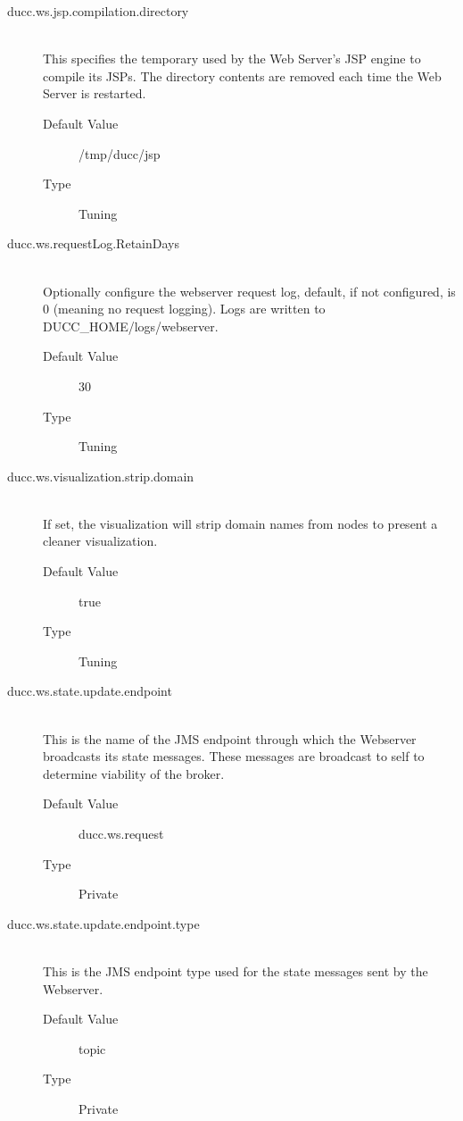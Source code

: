 \begin{description}
        \item[ducc.ws.jsp.compilation.directory] \hfill \\
          This specifies the temporary used by the Web Server's JSP engine to compile its JSPs.
          The directory contents are removed each time the Web Server is restarted.
          \begin{description}
            \item[Default Value] /tmp/ducc/jsp
            \item[Type] Tuning
          \end{description}

        \item[ducc.ws.requestLog.RetainDays] \hfill \\
          Optionally configure the webserver request log, default, if not configured, is 0 (meaning no request logging).
          Logs are written to DUCC\_HOME/logs/webserver.
          \begin{description}
            \item[Default Value] 30
            \item[Type] Tuning
          \end{description}

        \item[ducc.ws.visualization.strip.domain] \hfill \\
          If set, the visualization will strip domain names from nodes to present a cleaner visualization.
          \begin{description}
            \item[Default Value] true
            \item[Type] Tuning
          \end{description}

      \item[ducc.ws.state.update.endpoint] \hfill \\
        This is the name of the JMS endpoint through which the Webserver broadcasts its state messages. 
        These messages are broadcast to self to determine viability of the broker. 
        \begin{description}
          \item[Default Value] ducc.ws.request
          \item[Type] Private 
        \end{description}

      \item[ducc.ws.state.update.endpoint.type] \hfill \\
        This is the JMS endpoint type used for the state messages sent by the Webserver. 
        \begin{description}
          \item[Default Value] topic 
          \item[Type] Private
        \end{description} 
        

\end{description}
